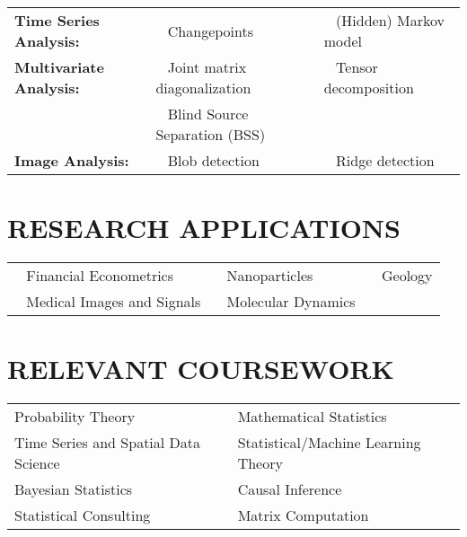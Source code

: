 \documentclass[pdftex,11pt]{article}	%
\begin{document}
\begin{tabularx}{\textwidth}{@{} p{4cm} X X @{}}
	{\bf Time Series Analysis:} & \textbullet ~ Changepoints & \textbullet ~ (Hidden) Markov model \\
	{\bf Multivariate Analysis:} & \textbullet ~ Joint matrix diagonalization & \textbullet ~ Tensor decomposition \\
	& \textbullet ~ Blind Source Separation (BSS) & \\
	{\bf Image Analysis:} & \textbullet ~ Blob detection & \textbullet ~ Ridge detection
\end{tabularx}

\section*{RESEARCH APPLICATIONS}

\begin{tabularx}{\textwidth}{@{} X X X @{}}
	\textbullet ~ Financial Econometrics & \textbullet ~ Nanoparticles & \textbullet ~ Geology \\
	\textbullet  ~ Medical Images and Signals & \textbullet ~ Molecular Dynamics & \\
\end{tabularx}

\section*{RELEVANT COURSEWORK}
\begin{tabularx}{\textwidth}{@{} X X @{}}
	Probability Theory & Mathematical Statistics \\
	Time Series and Spatial Data Science & Statistical/Machine Learning Theory \\
	Bayesian Statistics & Causal Inference \\
	Statistical Consulting & Matrix Computation
\end{tabularx}
\fi
\end{document}
